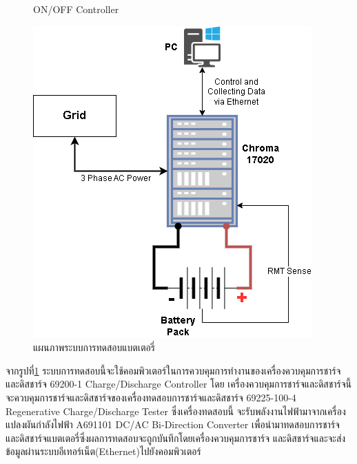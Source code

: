 \begin{center}
\begin{figure}[H]
			\caption{ON/OFF Controller}
	\end{figure}
\begin{figure}[!h]
	\includegraphics[width=0.5\linewidth]{Chapters/img/Testing_System.png}
		\centering
		\captionsetup{justification=centering,margin=2cm}
		\caption{แผนภาพระบบการทดสอบแบตเตอรี่}
		\label{fig:Testing_sys}
	\end{figure}
\end{center}
จากรูปที่\ref{fig:Testing_sys} ระบบการทดสอบนี้จะใช้คอมพิวเตอร์ในการควบคุมการทำงานของเครื่องควบคุมการชาร์จและดิสชาร์จ 69200-1 Charge/Discharge Controller โดย
เครื่องควบคุมการชาร์จและดิสชาร์จนี้จะควบคุมการชาร์จและดิสชาร์จของเครื่องทดสอบการชาร์จและดิสชาร์จ 69225-100-4 Regenerative Charge/Discharge Tester ซึ่งเครื่องทดสอบนี้
จะรับพลังงานไฟฟ้ามาจากเครื่องแปลงผันกำลังไฟฟ้า A691101 DC/AC Bi-Direction Converter เพื่อนำมาทดสอบการชาร์จและดิสชาร์จแบตเตอรี่ซึ่งผลการทดสอบจะถูกบันทึกโดยเครื่องควบคุมการชาร์จ
และดิสชาร์จและจะส่งข้อมูลผ่านระบบอีเทอร์เน็ต(Ethernet)ไปยังคอมพิวเตอร์
\vfill
